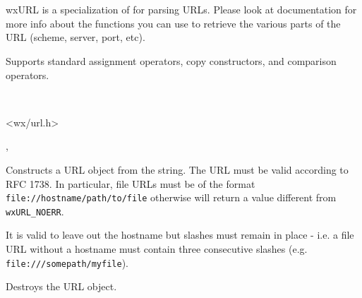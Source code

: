 \section{}\label{wxurl}

wxURL is a specialization of  for parsing URLs.
Please look at  documentation for more info about the functions
you can use to retrieve the various parts of the URL (scheme, server, port, etc).

Supports standard assignment operators, copy constructors,
and comparison operators.


\\


<wx/url.h>


, 



\label{wxurlctor}


Constructs a URL object from the string.  The URL must be valid according
to RFC 1738.  In particular, file URLs must be of the format
{\tt file://hostname/path/to/file} otherwise 
will return a value different from {\tt wxURL\_NOERR}.

It is valid to leave out the hostname but slashes must remain in place - 
i.e. a file URL without a hostname must contain three consecutive slashes 
(e.g. {\tt file:///somepath/myfile}).



\label{wxurldtor}


Destroys the URL object.

%
%
\label{wxurlgetprotocol}

